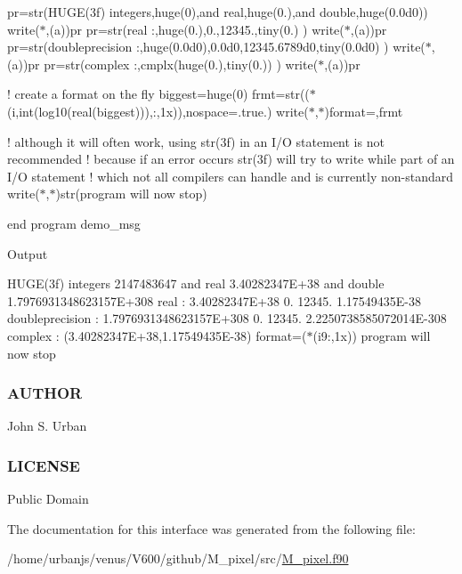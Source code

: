 pr=str(\textquotesingle{}H\+U\+G\+E(3f) integers\textquotesingle{},huge(0),\textquotesingle{}and real\textquotesingle{},huge(0.),\textquotesingle{}and double\textquotesingle{},huge(0.\+0d0)) write($\ast$,\textquotesingle{}(a)\textquotesingle{})pr pr=str(\textquotesingle{}real \+:\textquotesingle{},huge(0.),0.,12345.,tiny(0.) ) write($\ast$,\textquotesingle{}(a)\textquotesingle{})pr pr=str(\textquotesingle{}doubleprecision \+:\textquotesingle{},huge(0.\+0d0),0.\+0d0,12345.\+6789d0,tiny(0.\+0d0) ) write($\ast$,\textquotesingle{}(a)\textquotesingle{})pr pr=str(\textquotesingle{}complex \+:\textquotesingle{},cmplx(huge(0.),tiny(0.)) ) write($\ast$,\textquotesingle{}(a)\textquotesingle{})pr

! create a format on the fly biggest=huge(0) frmt=str(\textquotesingle{}($\ast$(i\textquotesingle{},int(log10(real(biggest))),\textquotesingle{}\+:,1x))\textquotesingle{},nospace=.true.) write($\ast$,$\ast$)\textquotesingle{}format=\textquotesingle{},frmt

! although it will often work, using str(3f) in an I/O statement is not recommended ! because if an error occurs str(3f) will try to write while part of an I/O statement ! which not all compilers can handle and is currently non-\/standard write($\ast$,$\ast$)str(\textquotesingle{}program will now stop\textquotesingle{})

end program demo\+\_\+msg

Output

H\+U\+G\+E(3f) integers 2147483647 and real 3.\+40282347E+38 and double 1.\+7976931348623157E+308 real \+: 3.\+40282347E+38 0. 12345. 1.\+17549435E-\/38 doubleprecision \+: 1.\+7976931348623157E+308 0. 12345. 2.\+2250738585072014E-\/308 complex \+: (3.\+40282347E+38,1.\+17549435E-\/38) format=($\ast$(i9\+:,1x)) program will now stop

\subsubsection*{A\+U\+T\+H\+OR}

John S. Urban

\subsubsection*{L\+I\+C\+E\+N\+SE}

Public Domain 

The documentation for this interface was generated from the following file\+:\begin{DoxyCompactItemize}
\item 
/home/urbanjs/venus/\+V600/github/\+M\+\_\+pixel/src/\mbox{\hyperlink{M__pixel_8f90}{M\+\_\+pixel.\+f90}}\end{DoxyCompactItemize}

